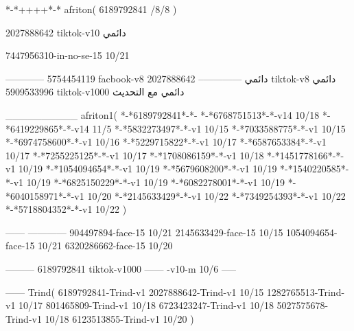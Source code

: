 *-*++++*-*
afriton(
6189792841 /8/8
)

2027888642 tiktok-v10
دائمي


7447956310-in-no-se-15 10/21

------------
5754454119 facbook-v8
دائمي
--------------
2027888642 tiktok-v8
دائمي
5909533996 tiktok-v1000
دائمي مع التحديث

__________
afriton1(
*-*6189792841*-*-
*-*6768751513*-*-v14 10/18
*-*6419229865*-*-v14 11/5
*-*5832273497*-*-v1 10/15
*-*7033588775*-*-v1 10/15
*-*6974758600*-*-v1 10/16
*-*5229715822*-*-v1 10/17
*-*6587653384*-*-v1 10/17
*-*7255225125*-*-v1 10/17
*-*1708086159*-*-v1 10/18
*-*1451778166*-*-v1 10/19
*-*1054094654*-*-v1 10/19
*-*5679608200*-*-v1 10/19
*-*1540220585*-*-v1 10/19
*-*6825150229*-*-v1 10/19
*-*6082278001*-*-v1 10/19
*-*6040158971*-*-v1 10/20
*-*2145633429*-*-v1 10/22
*-*7349254393*-*-v1 10/22
*-*5718804352*-*-v1 10/22
)

------
------------
904497894-face-15 10/21
2145633429-face-15 10/15
1054094654-face-15 10/21
6320286662-face-15 10/20

---------
6189792841 tiktok-v1000
------
-v10-m 10/6
-----

------
Trind(
6189792841-Trind-v1 
2027888642-Trind-v1 10/15
1282765513-Trind-v1 10/17
801465809-Trind-v1 10/18
6723423247-Trind-v1 10/18
5027575678-Trind-v1 10/18
6123513855-Trind-v1 10/20
)
